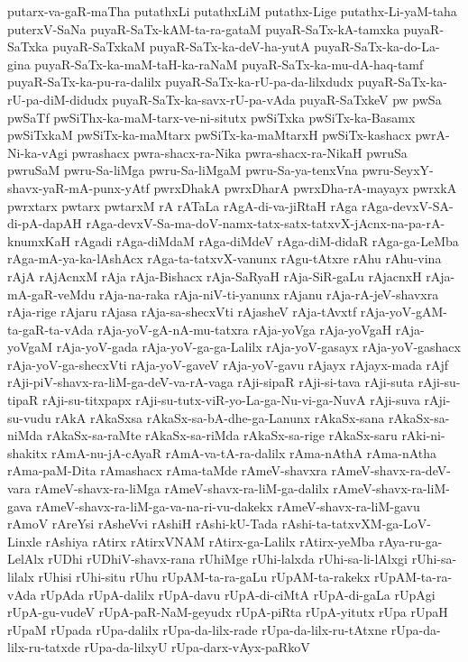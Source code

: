 {putarx-va-gaR-maTha
putathxLi
putathxLiM
putathx-Lige
putathx-Li-yaM-taha
puterxV-SaNa
puyaR-SaTx-kAM-ta-ra-gataM
puyaR-SaTx-kA-tamxka
puyaR-SaTxka
puyaR-SaTxkaM
puyaR-SaTx-ka-deV-ha-yutA
puyaR-SaTx-ka-do-La-gina
puyaR-SaTx-ka-maM-taH-ka-raNaM
puyaR-SaTx-ka-mu-dA-haq-tamf
puyaR-SaTx-ka-pu-ra-dalilx
puyaR-SaTx-ka-rU-pa-da-lilxdudx
puyaR-SaTx-ka-rU-pa-diM-didudx
puyaR-SaTx-ka-savx-rU-pa-vAda
puyaR-SaTxkeV
pw
pwSa
pwSaTf
pwSiThx-ka-maM-tarx-ve-ni-situtx
pwSiTxka
pwSiTx-ka-Basamx
pwSiTxkaM
pwSiTx-ka-maMtarx
pwSiTx-ka-maMtarxH
pwSiTx-kashacx
pwrA-Ni-ka-vAgi
pwrashacx
pwra-shacx-ra-Nika
pwra-shacx-ra-NikaH
pwruSa
pwruSaM
pwru-Sa-liMga
pwru-Sa-liMgaM
pwru-Sa-ya-tenxVna
pwru-SeyxY-shavx-yaR-mA-punx-yAtf
pwrxDhakA
pwrxDharA
pwrxDha-rA-mayayx
pwrxkA
pwrxtarx
pwtarx
pwtarxM
rA
rATaLa
rAgA-di-va-jiRtaH
rAga
rAga-devxV-SA-di-pA-dapAH
rAga-devxV-Sa-ma-doV-namx-tatx-satx-tatxvX-jAcnx-na-pa-rA-knumxKaH
rAgadi
rAga-diMdaM
rAga-diMdeV
rAga-diM-didaR
rAga-ga-LeMba
rAga-mA-ya-ka-lAshAcx
rAga-ta-tatxvX-vanunx
rAgu-tAtxre
rAhu
rAhu-vina
rAjA
rAjAcnxM
rAja
rAja-Bishacx
rAja-SaRyaH
rAja-SiR-gaLu
rAjacnxH
rAja-mA-gaR-veMdu
rAja-na-raka
rAja-niV-ti-yanunx
rAjanu
rAja-rA-jeV-shavxra
rAja-rige
rAjaru
rAjasa
rAja-sa-shecxVti
rAjasheV
rAja-tAvxtf
rAja-yoV-gAM-ta-gaR-ta-vAda
rAja-yoV-gA-nA-mu-tatxra
rAja-yoVga
rAja-yoVgaH
rAja-yoVgaM
rAja-yoV-gada
rAja-yoV-ga-ga-Lalilx
rAja-yoV-gasayx
rAja-yoV-gashacx
rAja-yoV-ga-shecxVti
rAja-yoV-gaveV
rAja-yoV-gavu
rAjayx
rAjayx-mada
rAjf
rAji-piV-shavx-ra-liM-ga-deV-va-rA-vaga
rAji-sipaR
rAji-si-tava
rAji-suta
rAji-su-tipaR
rAji-su-titxpapx
rAji-su-tutx-viR-yo-La-ga-Nu-vi-ga-NuvA
rAji-suva
rAji-su-vudu
rAkA
rAkaSxsa
rAkaSx-sa-bA-dhe-ga-Lanunx
rAkaSx-sana
rAkaSx-sa-niMda
rAkaSx-sa-raMte
rAkaSx-sa-riMda
rAkaSx-sa-rige
rAkaSx-saru
rAki-ni-shakitx
rAmA-nu-jA-cAyaR
rAmA-va-tA-ra-dalilx
rAma-nAthA
rAma-nAtha
rAma-paM-Dita
rAmashacx
rAma-taMde
rAmeV-shavxra
rAmeV-shavx-ra-deV-vara
rAmeV-shavx-ra-liMga
rAmeV-shavx-ra-liM-ga-dalilx
rAmeV-shavx-ra-liM-gava
rAmeV-shavx-ra-liM-ga-va-na-ri-vu-dakekx
rAmeV-shavx-ra-liM-gavu
rAmoV
rAreYsi
rAsheVvi
rAshiH
rAshi-kU-Tada
rAshi-ta-tatxvXM-ga-LoV-Linxle
rAshiya
rAtirx
rAtirxVNAM
rAtirx-ga-Lalilx
rAtirx-yeMba
rAya-ru-ga-LelAlx
rUDhi
rUDhiV-shavx-rana
rUhiMge
rUhi-lalxda
rUhi-sa-li-lAlxgi
rUhi-sa-lilalx
rUhisi
rUhi-situ
rUhu
rUpAM-ta-ra-gaLu
rUpAM-ta-rakekx
rUpAM-ta-ra-vAda
rUpAda
rUpA-dalilx
rUpA-davu
rUpA-di-ciMtA
rUpA-di-gaLa
rUpAgi
rUpA-gu-vudeV
rUpA-paR-NaM-geyudx
rUpA-piRta
rUpA-yitutx
rUpa
rUpaH
rUpaM
rUpada
rUpa-dalilx
rUpa-da-lilx-rade
rUpa-da-lilx-ru-tAtxne
rUpa-da-lilx-ru-tatxde
rUpa-da-lilxyU
rUpa-darx-vAyx-paRkoV
}
